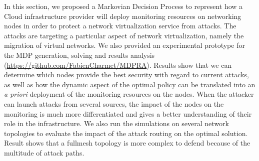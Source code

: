 \label{sec:mdp-conclusion}
In this section, we proposed a Markovian Decision Process to represent how a Cloud infrastructure provider will deploy monitoring resources on networking nodes in order to protect a network virtualization service from attacks.
The attacks are targeting a particular aspect of network virtualization, namely the migration of virtual networks.
We also provided an experimental prototype for the MDP generation, solving and results analysis  (\url{https://github.com/FabienCharmet/MDPRA}).
Results show that we can determine which nodes provide the best security with regard to current attacks, as well as how the dynamic aspect of the optimal policy can be translated into an \textit{a priori} deployment of the monitoring resources on the nodes.
When the attacker can launch attacks from several sources, the impact of the nodes on the monitoring is much more differentiated and gives a better understanding of their role in the infrastructure.
We also run the simulations on several network topologies to evaluate the impact of the attack routing on the optimal solution. Result shows that a fullmesh topology is more complex to defend because of the multitude of attack paths.